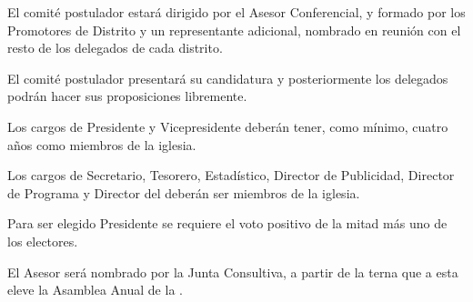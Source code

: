 \article
El comité postulador estará dirigido por el Asesor Conferencial, y formado por los Promotores de Distrito y un representante adicional, nombrado en reunión con el resto de los delegados de cada distrito.

\article
El comité postulador presentará su candidatura y posteriormente los delegados podrán hacer sus proposiciones libremente.

\article
Los cargos de Presidente y Vicepresidente deberán tener, como mínimo, cuatro años como miembros de la iglesia.

\article
Los cargos de Secretario, Tesorero, Estadístico, Director de Publicidad, Director de Programa y Director del \OOLMJ{} deberán ser miembros de la iglesia.

\article
Para ser elegido Presidente se requiere el voto positivo de la mitad más uno de los electores.

\article
El Asesor será nombrado por la Junta Consultiva, a partir de la terna que a esta eleve la Asamblea Anual de la \LMJ{}.
